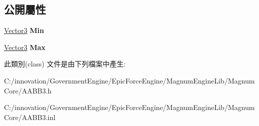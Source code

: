 \subsection*{公開屬性}
\begin{DoxyCompactItemize}
\item 
\hyperlink{class_i_dream_sky_1_1_vector3}{Vector3} {\bfseries Min}\hypertarget{class_i_dream_sky_1_1_a_a_b_b3_a96ef5af7c1a3eca7a03e3f9af028b4f8}{}\label{class_i_dream_sky_1_1_a_a_b_b3_a96ef5af7c1a3eca7a03e3f9af028b4f8}

\item 
\hyperlink{class_i_dream_sky_1_1_vector3}{Vector3} {\bfseries Max}\hypertarget{class_i_dream_sky_1_1_a_a_b_b3_a15082420bcfd8b429f6cc64042b5f6af}{}\label{class_i_dream_sky_1_1_a_a_b_b3_a15082420bcfd8b429f6cc64042b5f6af}

\end{DoxyCompactItemize}


此類別(class) 文件是由下列檔案中產生\+:\begin{DoxyCompactItemize}
\item 
C\+:/innovation/\+Government\+Engine/\+Epic\+Force\+Engine/\+Magnum\+Engine\+Lib/\+Magnum\+Core/A\+A\+B\+B3.\+h\item 
C\+:/innovation/\+Government\+Engine/\+Epic\+Force\+Engine/\+Magnum\+Engine\+Lib/\+Magnum\+Core/A\+A\+B\+B3.\+inl\end{DoxyCompactItemize}
